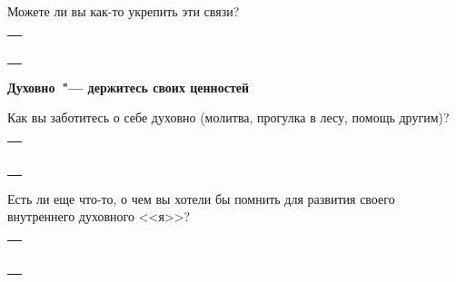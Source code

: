 \begin{itemize}
	\itemWritingHand Можете ли вы как-то укрепить эти связи?
\end{itemize}

\setlength{\extrarowheight}{2mm}
\begin{tabularx}{\textwidth}{X}
	\\
	\arrayrulecolor{gray}\hline\\
	\hline\\
	\hline\\
	\hline\\
	\hline\\
	\hline\\
\end{tabularx}
\setlength{\extrarowheight}{0mm}

\vspace{5ex}

{\large \textbf{Духовно~"--- держитесь своих ценностей}}

\begin{itemize}
	\itemWritingHand Как вы заботитесь о себе духовно (молитва, прогулка в лесу, помощь другим)?
\end{itemize}

\setlength{\extrarowheight}{2mm}
\begin{tabularx}{\textwidth}{X}
	\\
	\arrayrulecolor{gray}\hline\\
	\hline\\
	\hline\\
	\hline\\
	\hline\\
	\hline\\
	\hline\\
\end{tabularx}
\setlength{\extrarowheight}{0mm}

\begin{itemize}
	\itemWritingHand Есть ли еще что-то, о чем вы хотели бы помнить для развития своего внутреннего духовного <<я>>?
\end{itemize}

\setlength{\extrarowheight}{2mm}
\begin{tabularx}{\textwidth}{X}
	\\
	\arrayrulecolor{gray}\hline\\
	\hline\\
	\hline\\
	\hline\\
	\hline\\
	\hline\\
	\hline\\
\end{tabularx}
\setlength{\extrarowheight}{0mm}
